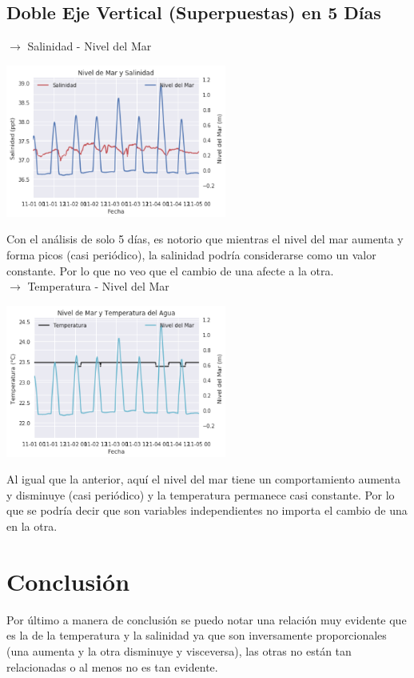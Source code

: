 \documentclass[12pt]{article}
\begin{document}
\subsection*{Doble Eje Vertical (Superpuestas) en 5 Días}
$\rightarrow$ Salinidad - Nivel del Mar
\begin{center}
	\includegraphics[height=5cm]{gf1.png}
\end{center}
Con el análisis de solo 5 días, es notorio que mientras el nivel del mar aumenta y forma picos (casi periódico), la salinidad podría considerarse como un valor constante. Por lo que no veo que el cambio de una afecte a la otra.\\
\newpage
$\rightarrow$ Temperatura - Nivel del Mar
\begin{center}
	\includegraphics[height=5cm]{gf2.png}
\end{center}
Al igual que la anterior, aquí el nivel del mar tiene un comportamiento aumenta y disminuye (casi periódico) y la temperatura permanece casi constante. Por lo que se podría decir que son variables independientes no importa el cambio de una en la otra.

\section*{Conclusión}
Por último a manera de conclusión se puedo notar una relación muy evidente que es la de la temperatura y la salinidad ya que son inversamente proporcionales (una aumenta y la otra disminuye y visceversa), las otras no están tan relacionadas o al menos no es tan evidente.\\
\end{document}
